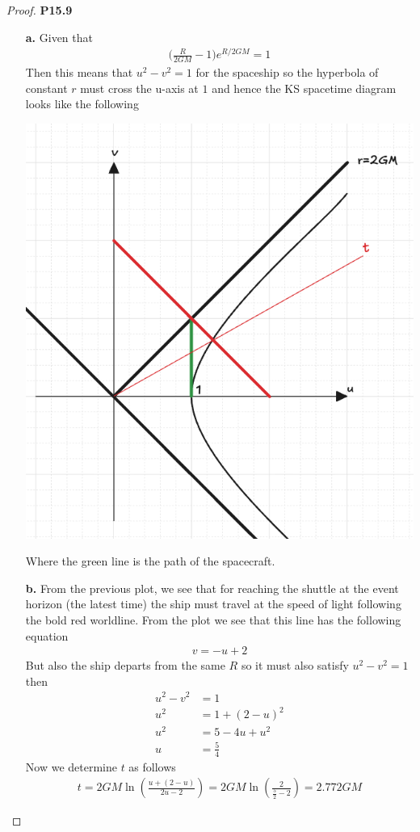 \documentclass[11pt]{article}
\theoremstyle{definition}
\begin{document}
\cleardoublepage
\begin{proof}{\textbf{P15.9}}
\begin{itemize}
\item [\textbf{a.}] Given that
\begin{align*}
    \bigg(\frac{R}{2GM} - 1\bigg)e^{R/2GM} = 1
\end{align*}
Then this means that $u^2 - v^2 = 1$ for the spaceship so the hyperbola of
constant $r$ must cross the u-axis at $1$ and hence the KS spacetime diagram
looks like the following
\begin{center}
    \includegraphics[scale=0.35]{ch15-p15.9.png}
\end{center}
Where the green line is the path of the spacecraft.

\item [\textbf{b.}] From the previous plot, we see that for reaching the
shuttle at the event horizon (the latest time) the ship must travel at the
speed of light following the bold red worldline.
From the plot we see that this line has the following equation
\begin{align*}
    v = -u + 2
\end{align*}
But also the ship departs from the same $R$ so it must also satisfy
$u^2 - v^2 = 1$ then
\begin{align*}
    u^2 - v^2 &= 1\\
    u^2 &= 1 + (2 - u)^2\\
    u^2 &= 5 - 4u + u^2\\
    u &= \frac{5}{4}
\end{align*}
Now we determine $t$ as follows
\begin{align*}
    t = 2GM \ln(\frac{u + (2 - u)}{2u -2}) = 2GM \ln(\frac{2}{\frac{5}{2} - 2})
    = 2.772 GM
\end{align*}
\end{itemize}
\end{proof}
\end{document}
